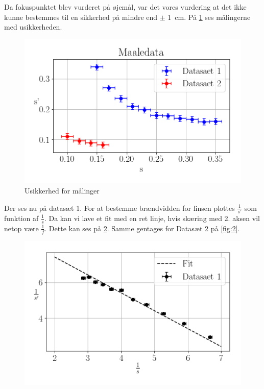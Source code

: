 Da fokuspunktet blev vurderet på øjemål, var det vores vurdering at det ikke kunne bestemmes til en sikkerhed på mindre end $\pm $ \SI{1}{\centi\meter}. På \cref{fig:usikkerhed} ses målingerne med usikkerheden.
\begin{figure}[H]
    \includegraphics[width=\linewidth]{usikkerhed.png}
    \caption{Usikkerhed for målinger}
    \label{fig:usikkerhed}
\end{figure}
Der ses nu på datasæt 1. For at bestemme brændvidden for linsen plottes $\frac{1}{s'}$ som funktion af $\frac{1}{s}$. Da kan vi lave et fit med en ret linje, hvis skæring med 2. aksen vil netop være  $\frac{1}{f}$. Dette kan ses på \cref{fig:1}. Samme gentages for Datasæt 2 på \cref{fig:2}.
\begin{figure}[H]
    \includegraphics[width=\linewidth]{1.png}
    \caption{}
    \label{fig:1}
\end{figure}
